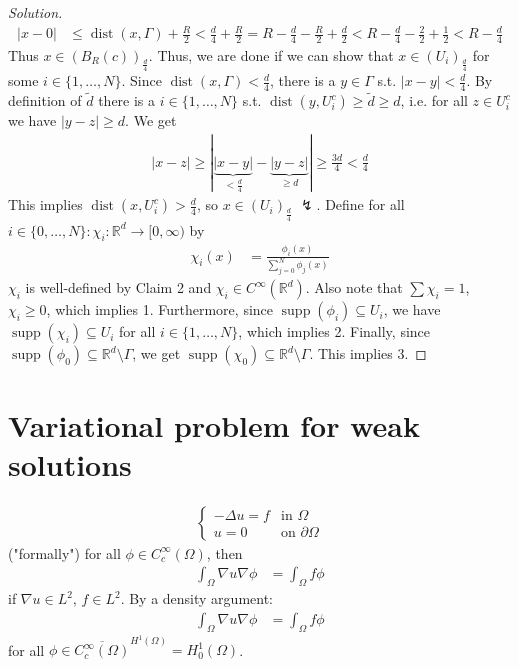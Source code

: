 \documentclass{report}
\theoremstyle{tommy}
\newcommand{\dist}{\operatorname{dist}}
\newcommand{\supp}{\operatorname{supp}}
\begin{document}
\begin{proof}[Solution]
    \begin{align*}
      |x-0|
      &\le \dist(x, \Gamma) + \frac{R}{2}
      < \frac{d}{4} + \frac{R}{2} = R - \frac{d}{4} - \frac{R}{2} + \frac{d}{2} < R - \frac{d}{4} - \frac{2}{2} + \frac{1}{2} < R - \frac{d}{4}
    \end{align*}
    Thus \(x \in (B_R(c))_{\frac{d}{4}}\). Thus, we are done if we can show that \(x \in (U_i)_{\frac{d}{4}}\) for some \(i \in \{1, \dots, N\}\). Since \(\dist(x, \Gamma) < \frac{d}{4}\), there is a \(y \in \Gamma\) s.t. \(|x-y| < \frac{d}{4}\). By definition of \(\tilde d\) there is a \(i \in \{1, \dots, N\}\) s.t. \(\dist(y, U_i^c) \ge \tilde d \ge d\), i.e. for all \(z \in U_i^c\) we have \(|y-z| \ge d\). We get 
    \begin{align*}
      |x-z| \ge |\underbrace{|x-y|}_{< \frac{d}{4}}-\underbrace{|y-z|}_{\ge d}| \ge \frac{3d}{4} < \frac{d}{4}
    \end{align*}
    This implies \(\dist(x, U_i^c) > \frac{d}{4}\), so \(x \in (U_i)_{\frac{d}{4}}\) \(\lightning\).
    Define for all \(i \in \{0, \dots, N\}: \chi_i: \mathbb{R}^d \to [0, \infty)\) by 
    \begin{align*}
      \chi_i(x) &= \frac{\phi_i(x)}{\sum_{j=0}^N \phi_j(x)}
    \end{align*}
    \(\chi_i\) is well-defined by Claim 2 and \(\chi_i \in C^\infty(\mathbb{R}^d)\). Also note that \(\sum \chi_i = 1\), \(\chi_i \ge 0\), which implies 1. Furthermore, since \(\supp(\phi_i) \subseteq U_i\), we have \(\supp(\chi_i) \subseteq U_i\) for all \(i \in \{1, \dots, N\}\), which implies 2. Finally, since \(\supp(\phi_0) \subseteq \mathbb{R}^d \setminus \Gamma\), we get \(\supp(\chi_0) \subseteq \mathbb{R}^d \setminus \Gamma\). This implies 3.
  \end{proof}

  \section{Variational problem for weak solutions}
  \begin{align*}
    \begin{cases}
      -\Delta u = f &\text{in } \Omega \\
      u = 0 &\text{on } \partial \Omega
    \end{cases}
  \end{align*}
    ("formally") for all \(\phi \in C_c^\infty(\Omega)\), then
    \begin{align*}
      \int_\Omega \nabla u \nabla \phi &= \int_\Omega f \phi
    \end{align*}
    if \(\nabla u \in L^2\), \(f \in L^2\). By a density argument:
    \begin{align*}
      \int_\Omega \nabla u \nabla \phi &= \int_\Omega f \phi
    \end{align*}
    for all \(\phi \in \overline{C_c^\infty(\Omega)}^{H^1(\Omega)} = H^1_0(\Omega)\).
\end{document}
